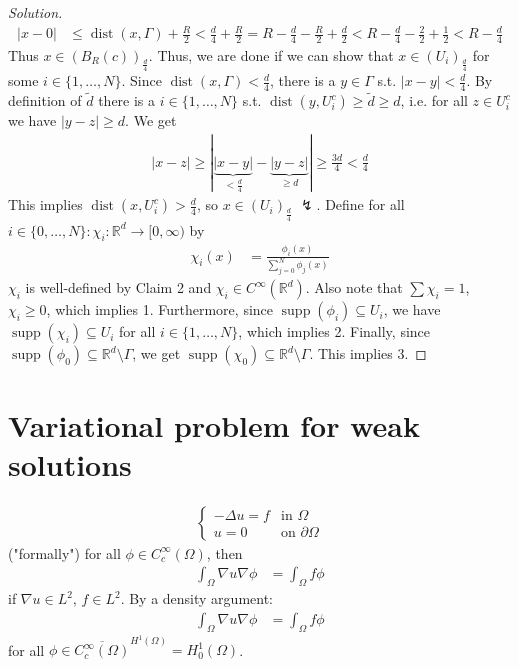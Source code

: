 \documentclass{report}
\theoremstyle{tommy}
\newcommand{\dist}{\operatorname{dist}}
\newcommand{\supp}{\operatorname{supp}}
\begin{document}
\begin{proof}[Solution]
    \begin{align*}
      |x-0|
      &\le \dist(x, \Gamma) + \frac{R}{2}
      < \frac{d}{4} + \frac{R}{2} = R - \frac{d}{4} - \frac{R}{2} + \frac{d}{2} < R - \frac{d}{4} - \frac{2}{2} + \frac{1}{2} < R - \frac{d}{4}
    \end{align*}
    Thus \(x \in (B_R(c))_{\frac{d}{4}}\). Thus, we are done if we can show that \(x \in (U_i)_{\frac{d}{4}}\) for some \(i \in \{1, \dots, N\}\). Since \(\dist(x, \Gamma) < \frac{d}{4}\), there is a \(y \in \Gamma\) s.t. \(|x-y| < \frac{d}{4}\). By definition of \(\tilde d\) there is a \(i \in \{1, \dots, N\}\) s.t. \(\dist(y, U_i^c) \ge \tilde d \ge d\), i.e. for all \(z \in U_i^c\) we have \(|y-z| \ge d\). We get 
    \begin{align*}
      |x-z| \ge |\underbrace{|x-y|}_{< \frac{d}{4}}-\underbrace{|y-z|}_{\ge d}| \ge \frac{3d}{4} < \frac{d}{4}
    \end{align*}
    This implies \(\dist(x, U_i^c) > \frac{d}{4}\), so \(x \in (U_i)_{\frac{d}{4}}\) \(\lightning\).
    Define for all \(i \in \{0, \dots, N\}: \chi_i: \mathbb{R}^d \to [0, \infty)\) by 
    \begin{align*}
      \chi_i(x) &= \frac{\phi_i(x)}{\sum_{j=0}^N \phi_j(x)}
    \end{align*}
    \(\chi_i\) is well-defined by Claim 2 and \(\chi_i \in C^\infty(\mathbb{R}^d)\). Also note that \(\sum \chi_i = 1\), \(\chi_i \ge 0\), which implies 1. Furthermore, since \(\supp(\phi_i) \subseteq U_i\), we have \(\supp(\chi_i) \subseteq U_i\) for all \(i \in \{1, \dots, N\}\), which implies 2. Finally, since \(\supp(\phi_0) \subseteq \mathbb{R}^d \setminus \Gamma\), we get \(\supp(\chi_0) \subseteq \mathbb{R}^d \setminus \Gamma\). This implies 3.
  \end{proof}

  \section{Variational problem for weak solutions}
  \begin{align*}
    \begin{cases}
      -\Delta u = f &\text{in } \Omega \\
      u = 0 &\text{on } \partial \Omega
    \end{cases}
  \end{align*}
    ("formally") for all \(\phi \in C_c^\infty(\Omega)\), then
    \begin{align*}
      \int_\Omega \nabla u \nabla \phi &= \int_\Omega f \phi
    \end{align*}
    if \(\nabla u \in L^2\), \(f \in L^2\). By a density argument:
    \begin{align*}
      \int_\Omega \nabla u \nabla \phi &= \int_\Omega f \phi
    \end{align*}
    for all \(\phi \in \overline{C_c^\infty(\Omega)}^{H^1(\Omega)} = H^1_0(\Omega)\).
\end{document}
